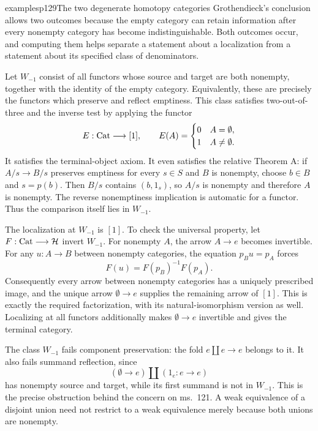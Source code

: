 \begin{dcomment}{examples}{p129}{The two degenerate homotopy categories}
Grothendieck's conclusion allows two outcomes because the empty category can retain information after every nonempty category has become indistinguishable. Both outcomes occur, and computing them helps separate a statement about a localization from a statement about its specified class of denominators.

Let $W_{-1}$ consist of all functors whose source and target are both nonempty, together with the identity of the empty category. Equivalently, these are precisely the functors which preserve and reflect emptiness. This class satisfies two-out-of-three and the inverse test by applying the functor
\[
 E:\mathrm{Cat}\longrightarrow[1],\qquad
 E(A)=\begin{cases}0&A=\emptyset,\\1&A\ne\emptyset.\end{cases}
\]
It satisfies the terminal-object axiom. It even satisfies the relative Theorem A: if $A/s\longrightarrow B/s$ preserves emptiness for every $s\in S$ and $B$ is nonempty, choose $b\in B$ and $s=p(b)$. Then $B/s$ contains $(b,1_s)$, so $A/s$ is nonempty and therefore $A$ is nonempty. The reverse nonemptiness implication is automatic for a functor. Thus the comparison itself lies in $W_{-1}$.

The localization at $W_{-1}$ is $[1]$. To check the universal property, let $F:\mathrm{Cat}\longrightarrow\mathcal H$ invert $W_{-1}$. For nonempty $A$, the arrow $A\longrightarrow e$ becomes invertible. For any $u:A\longrightarrow B$ between nonempty categories, the equation $p_Bu=p_A$ forces
\[
 F(u)=F(p_B)^{-1}F(p_A).
\]
Consequently every arrow between nonempty categories has a uniquely prescribed image, and the unique arrow $\emptyset\longrightarrow e$ supplies the remaining arrow of $[1]$. This is exactly the required factorization, with its natural-isomorphism version as well. Localizing at all functors additionally makes $\emptyset\longrightarrow e$ invertible and gives the terminal category.

The class $W_{-1}$ fails component preservation: the fold $e\amalg e\longrightarrow e$ belongs to it. It also fails summand reflection, since
\[
 (\emptyset\longrightarrow e)\amalg(1_e:e\longrightarrow e)
\]
has nonempty source and target, while its first summand is not in $W_{-1}$. This is the precise obstruction behind the concern on ms.~121. A weak equivalence of a disjoint union need not restrict to a weak equivalence merely because both unions are nonempty.


\end{dcomment}
